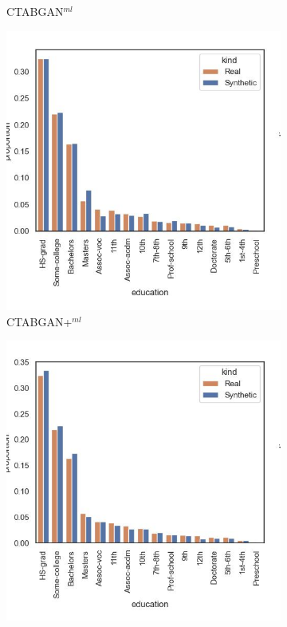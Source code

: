 \begin{figure}[h]
\begin{subfigure}{0.23\textwidth}
		\caption{CTABGAN$^{ml}$}
	\end{subfigure}
	\begin{subfigure}{0.23\textwidth}
		\centering
		\includegraphics[width=\textwidth]{images/dist_education/ctabgan+.jpg}
		\caption{CTABGAN+$^{ml}$}
	\end{subfigure}
	\begin{subfigure}{0.23\textwidth}
		\centering
		\includegraphics[width=\textwidth]{images/dist_education/SMOTE.jpg}

\end{subfigure}
\end{figure}
